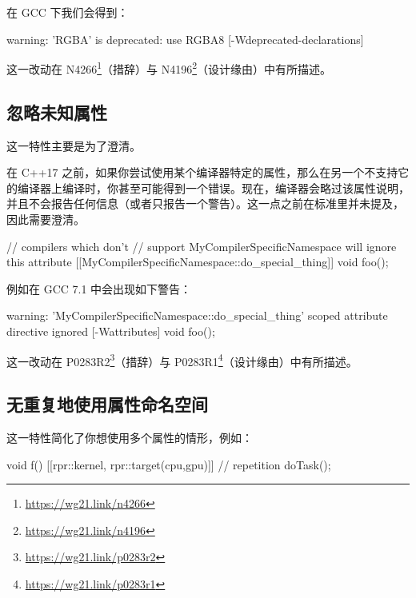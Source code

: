 在 GCC 下我们会得到：

\begin{codebox}
warning: 'RGBA' is deprecated: use RGBA8
[-Wdeprecated-declarations]
\end{codebox}

\begin{myInfoBox}
这一改动在 N4266\footnote{\url{https://wg21.link/n4266}}（措辞）与 N4196\footnote{\url{https://wg21.link/n4196}}（设计缘由）中有所描述。
\end{myInfoBox}

\subsection{忽略未知属性}

这一特性主要是为了澄清。

在 C++17 之前，如果你尝试使用某个编译器特定的属性，那么在另一个不支持它的编译器上编译时，你甚至可能得到一个错误。现在，编译器会略过该属性说明，并且不会报告任何信息（或者只报告一个警告）。这一点之前在标准里并未提及，因此需要澄清。

\begin{codebox}[cpp]
// compilers which don't
// support MyCompilerSpecificNamespace will ignore this attribute
[[MyCompilerSpecificNamespace::do_special_thing]]
void foo();
\end{codebox}

例如在 GCC 7.1 中会出现如下警告：

\begin{codebox}
warning: 'MyCompilerSpecificNamespace::do_special_thing'
scoped attribute directive ignored [-Wattributes]
void foo();
\end{codebox}

\begin{myInfoBox}
这一改动在 P0283R2\footnote{\url{https://wg21.link/p0283r2}}（措辞）与 P0283R1\footnote{\url{https://wg21.link/p0283r1}}（设计缘由）中有所描述。
\end{myInfoBox}

\subsection{无重复地使用属性命名空间}

这一特性简化了你想使用多个属性的情形，例如：

\begin{codebox}[cpp]
void f() {
[[rpr::kernel, rpr::target(cpu,gpu)]] // repetition
doTask();
}
\end{codebox}

